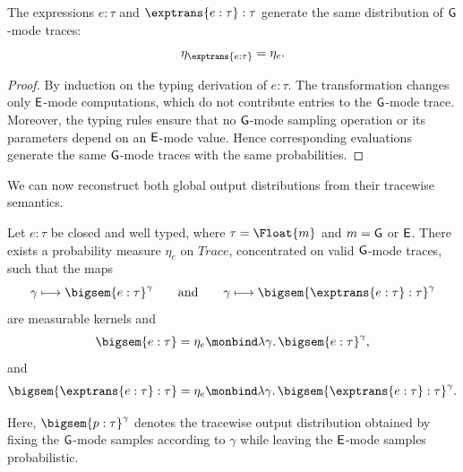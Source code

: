 \begin{lemma}
\label{lem:preservation-of-trace-distribution}
The expressions $e:\tau$ and $\exptrans{e:\tau}:\tau$ generate the same
distribution of $\mathsf{G}$-mode traces:
\[
  \eta_{\exptrans{e:\tau}}
  =
  \eta_e.
\]
\end{lemma}

\begin{proof}
  By induction on the typing derivation of $e:\tau$. The transformation
  changes only $\mathsf{E}$-mode computations, which do not contribute entries
  to the $\mathsf{G}$-mode trace. Moreover, the typing rules ensure that no
  $\mathsf{G}$-mode sampling operation or its parameters depend on an
  $\mathsf{E}$-mode value. Hence corresponding evaluations generate the same
  $\mathsf{G}$-mode traces with the same probabilities.
\end{proof}

We can now reconstruct both global output distributions from their
tracewise semantics.

\begin{theorem}
  \label{thm:trace-representation}
  Let $e:\tau$ be closed and well typed, where
  $\tau=\Float{m}$ and $m=\mathsf{G}$ or $\mathsf{E}$.
  There exists a probability measure $\eta_e$ on $Trace$, concentrated on
  valid $\mathsf{G}$-mode traces, such that the maps
  \[
    \gamma\longmapsto\bigsem{e:\tau}^{\gamma}
    \qquad\text{and}\qquad
    \gamma\longmapsto
    \bigsem{\exptrans{e:\tau}:\tau}^{\gamma}
  \]
  are measurable kernels and
  \[
    \bigsem{e:\tau}
    =
    \eta_e
    \monbind
    \lambda\gamma.\,
    \bigsem{e:\tau}^{\gamma},
  \]
  and
  \[
    \bigsem{\exptrans{e:\tau}:\tau}
    =
    \eta_e
    \monbind
    \lambda\gamma.\,
    \bigsem{\exptrans{e:\tau}:\tau}^{\gamma}.
  \]

  Here, $\bigsem{p:\tau}^{\gamma}$ denotes the tracewise output
  distribution obtained by fixing the $\mathsf{G}$-mode samples according to
  $\gamma$ while leaving the $\mathsf{E}$-mode samples probabilistic.
\end{theorem}

